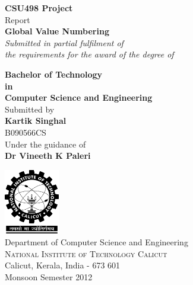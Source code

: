 \begin{titlepage}

\begin{center}

\textup{\small {\bf CSU498 Project} \\ Report}\\[0.4in]

\Large \textbf {Global Value Numbering}\\[0.5in]

       \small \emph{Submitted in partial fulfilment of\\
        the requirements for the award of the degree of}
        \vspace{.2in}

       {\bf Bachelor of Technology \\in\\ Computer Science and Engineering}\\[0.5in]

\normalsize Submitted by \\[0.2in]
\textbf {Kartik Singhal} \\ 
B090566CS\\

\vspace{.3in}
Under the guidance of\\
{\textbf{Dr Vineeth K Paleri}}\\
\vfill

\includegraphics[width=0.18\textwidth]{./nitc-logo}\\[0.2in]
\Large{Department of Computer Science and Engineering}\\
\normalsize
\textsc{National Institute of Technology Calicut}\\
Calicut, Kerala, India - 673 601 \\
\vspace{0.5cm}
Monsoon Semester 2012

\end{center}

\end{titlepage}
